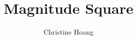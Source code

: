 \documentclass{article}
\title{Magnitude Square}
\author{Christine Hoang}
\begin{document}
\maketitle

\section{}
\end{document}
